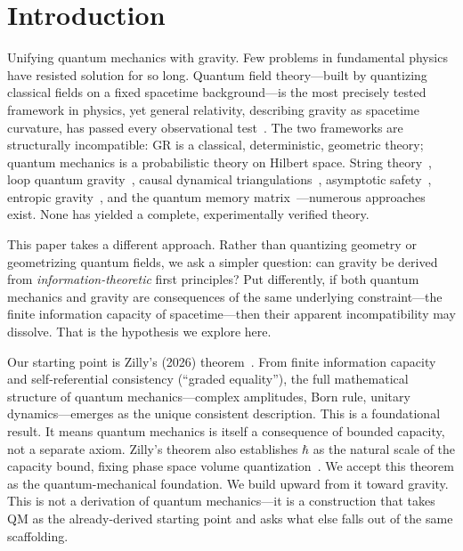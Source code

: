 \documentclass[aps,prd,twocolumn,showpacs,superscriptaddress,preprintnumbers]{revtex4-2}
\begin{document}
\section{Introduction}
\label{sec:intro}

Unifying quantum mechanics with gravity. Few problems in fundamental physics have resisted solution for so long.
Quantum field theory---built by quantizing classical fields on a fixed spacetime background---is the most precisely tested framework in physics, yet general relativity, describing gravity as spacetime curvature, has passed every observational test~\cite{Will:2014}.
The two frameworks are structurally incompatible: GR is a classical, deterministic, geometric theory; quantum mechanics is a probabilistic theory on Hilbert space.
String theory~\cite{Green:1987sp,Polchinski:1998rq}, loop quantum gravity~\cite{Rovelli:2004tv,Ashtekar:2004eh}, causal dynamical triangulations~\cite{Ambjorn:2001cv}, asymptotic safety~\cite{Weinberg:1979,Reuter:2012}, entropic gravity~\cite{Verlinde:2010hp,Jacobson:1995ab}, and the quantum memory matrix~\cite{Neukart:2024qmm}---numerous approaches exist.
None has yielded a complete, experimentally verified theory.

This paper takes a different approach. Rather than quantizing geometry or geometrizing quantum fields, we ask a simpler question: can gravity be derived from \emph{information-theoretic} first principles?
Put differently, if both quantum mechanics and gravity are consequences of the same underlying constraint---the finite information capacity of spacetime---then their apparent incompatibility may dissolve.
That is the hypothesis we explore here.

Our starting point is Zilly's (2026) theorem~\cite{Zilly:2026}. From finite information capacity and self-referential consistency (``graded equality''), the full mathematical structure of quantum mechanics---complex amplitudes, Born rule, unitary dynamics---emerges as the unique consistent description.
This is a foundational result. It means quantum mechanics is itself a consequence of bounded capacity, not a separate axiom.
Zilly's theorem also establishes $\hbar$ as the natural scale of the capacity bound, fixing phase space volume quantization~\cite{Zilly:2026}.
We accept this theorem as the quantum-mechanical foundation.
We build upward from it toward gravity. This is not a derivation of quantum mechanics---it is a construction that takes QM as the already-derived starting point and asks what else falls out of the same scaffolding.
\end{document}
